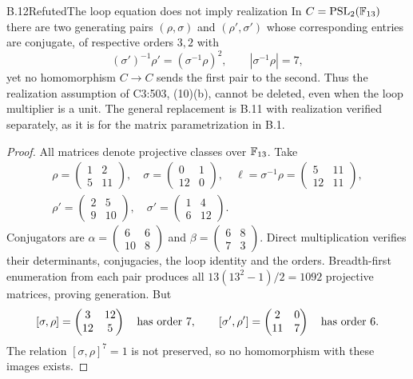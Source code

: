 \begin{statement}{B.12}{Refuted}{The loop equation does not imply realization}
In $C=\mathrm{PSL}_2(\mathbb F_{13})$ there are two generating pairs
$(\rho,\sigma)$ and $(\rho',\sigma')$ whose corresponding
entries are conjugate, of respective
orders $3,2$ with
\[
 (\sigma')^{-1}\rho'=(\sigma^{-1}\rho)^2,\qquad
 |\sigma^{-1}\rho|=7,
\]
yet no homomorphism $C\to C$ sends the first pair to the second.
Thus the realization assumption of C3:503, (10)(b), cannot be
deleted, even when the loop multiplier is a unit. The general
replacement is B.11 with realization verified separately, as
it is for the matrix parametrization in B.1.
\end{statement}
\begin{proof}
All matrices denote projective classes over $\mathbb F_{13}$. Take
\[
\begin{gathered}
\rho=\begin{pmatrix}1&2\\5&11\end{pmatrix},\quad
\sigma=\begin{pmatrix}0&1\\12&0\end{pmatrix},\quad
\ell=\sigma^{-1}\rho=\begin{pmatrix}5&11\\12&11\end{pmatrix},\\
\rho'=\begin{pmatrix}2&5\\9&10\end{pmatrix},\quad
\sigma'=\begin{pmatrix}1&4\\6&12\end{pmatrix}.
\end{gathered}
\]
Conjugators are
$\alpha=\left(\begin{smallmatrix}6&6\\10&8\end{smallmatrix}\right)$
and $\beta=\left(\begin{smallmatrix}6&8\\7&3\end{smallmatrix}\right)$.
Direct multiplication verifies their determinants, conjugacies,
the loop identity and the orders. Breadth-first enumeration
from each pair produces all $13(13^2-1)/2=1092$ projective
matrices, proving generation. But
\[
 [\sigma,\rho]=\begin{pmatrix}3&12\\12&5\end{pmatrix}
 \quad\hbox{has order }7,\qquad
 [\sigma',\rho']=\begin{pmatrix}2&0\\11&7\end{pmatrix}
 \quad\hbox{has order }6.
\]
The relation $[\sigma,\rho]^7=1$ is not preserved, so no
homomorphism with these images exists.


\end{proof}
